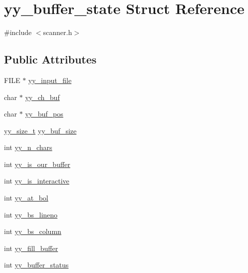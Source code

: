 \hypertarget{structyy__buffer__state}{
\section{yy\_\-buffer\_\-state Struct Reference}
\label{structyy__buffer__state}
}


{\ttfamily \#include $<$scanner.h$>$}

\subsection*{Public Attributes}
\begin{DoxyCompactItemize}
\item 
FILE $\ast$ \hyperlink{structyy__buffer__state_a4360acfb226a1fc240ab2be17dd6beda}{yy\_\-input\_\-file}
\item 
char $\ast$ \hyperlink{structyy__buffer__state_a0d25458e69eb22207fc633a1255d099d}{yy\_\-ch\_\-buf}
\item 
char $\ast$ \hyperlink{structyy__buffer__state_a8435c3f786bbb55d21d0174e4cfc22a0}{yy\_\-buf\_\-pos}
\item 
\hyperlink{scanner_8c_ad557845057f187eec4be07e2717d2afa}{yy\_\-size\_\-t} \hyperlink{structyy__buffer__state_a48302f5f3477a9c78bbddf56d356ef54}{yy\_\-buf\_\-size}
\item 
int \hyperlink{structyy__buffer__state_a06406208824817acfec2183b79080945}{yy\_\-n\_\-chars}
\item 
int \hyperlink{structyy__buffer__state_a80ce2431c70dc4f89ced487f18449465}{yy\_\-is\_\-our\_\-buffer}
\item 
int \hyperlink{structyy__buffer__state_abf5c70eea75581b58c0ee7bd31b14490}{yy\_\-is\_\-interactive}
\item 
int \hyperlink{structyy__buffer__state_a9d60c60af6e1a6f69de16871fd64f85f}{yy\_\-at\_\-bol}
\item 
int \hyperlink{structyy__buffer__state_a818e94bc9c766e683c60df1e9fd01199}{yy\_\-bs\_\-lineno}
\item 
int \hyperlink{structyy__buffer__state_a10c4fcd8be759e6bf11e6d3e8cdb0307}{yy\_\-bs\_\-column}
\item 
int \hyperlink{structyy__buffer__state_a63d2afbb1d79a3fc63df9e12626f827d}{yy\_\-fill\_\-buffer}
\item 
int \hyperlink{structyy__buffer__state_a70fd925d37a2f0454fbd0def675d106c}{yy\_\-buffer\_\-status}
\end{DoxyCompactItemize}


